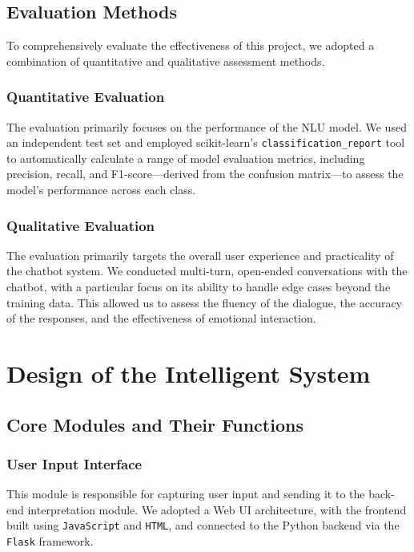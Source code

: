 \documentclass{xum_review}
\begin{document}
	\subsection{Evaluation Methods}

	To comprehensively evaluate the effectiveness of this project, we adopted a
	combination of quantitative and qualitative assessment
	methods\citep{0b014ee667a84c5985984bfd771595a3}.

	\subsubsection{Quantitative Evaluation}
	
	The evaluation primarily focuses on the performance of the NLU model. We
	used an independent test set and employed scikit-learn's
	\texttt{classification\_report} tool to automatically calculate a range of
	model evaluation metrics, including precision, recall, and F1-score—derived
	from the confusion matrix—to assess the model's performance across each
	class\citep{scikit-learn_classification_report_nd}.

	\subsubsection{Qualitative Evaluation}

	The evaluation primarily targets the overall user experience and
	practicality of the chatbot system. We conducted multi-turn, open-ended
	conversations with the chatbot, with a particular focus on its ability to
	handle edge cases beyond the training data. This allowed us to assess the
	fluency of the dialogue, the accuracy of the responses, and the
	effectiveness of emotional interaction.

\section{Design of the Intelligent System}

	\subsection{Core Modules and Their Functions}

	\subsubsection{User Input Interface}

	This module is responsible for capturing user input and sending it to the
	back-end interpretation module. We adopted a Web UI architecture, with the
	frontend built using \texttt{JavaScript} and \texttt{HTML}, and connected to
	the Python backend via the \texttt{Flask} framework.
\end{document}
